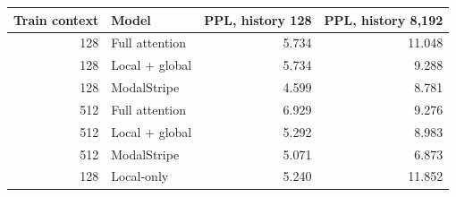 \documentclass[11pt,letterpaper]{article}
\begin{document}
\begin{center}\begin{minipage}{\textwidth}\centering\small
{}

\begin{tabular}{rlrr}\toprule
Train context & Model & PPL, history 128 & PPL, history 8,192\\\midrule
128 & Full attention & 5.734 & 11.048 \\
128 & Local + global & 5.734 & 9.288 \\
128 & ModalStripe & 4.599 & 8.781 \\
512 & Full attention & 6.929 & 9.276 \\
512 & Local + global & 5.292 & 8.983 \\
512 & ModalStripe & 5.071 & 6.873 \\
128 & Local-only & 5.240 & 11.852 \\
\bottomrule\end{tabular}


\end{minipage}\end{center}
\end{document}
